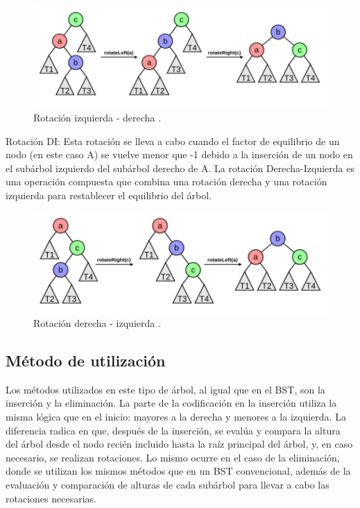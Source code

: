 \documentclass[journal]{IEEEtran}
\begin{document}
\begin{figure}[H]
    \centering
    \includegraphics[scale=0.7]{LR rotation.PNG}
    \captionsetup{justification=centering}  %
    \caption{Rotación izquierda - derecha \cite{Algoritmos y Programación}.}
    \label{fig:enter-label}
\end{figure}

Rotación DI: Esta rotación se lleva a cabo cuando el factor de equilibrio de un nodo (en este caso A) se vuelve menor que -1 debido a la inserción de un nodo en el subárbol izquierdo del subárbol derecho de A. La rotación Derecha-Izquierda es una operación compuesta que combina una rotación derecha y una rotación izquierda para restablecer el equilibrio del árbol. 

\begin{figure}[H]
    \centering
    \includegraphics[scale=0.7]{RL rotation.PNG}
    \captionsetup{justification=centering}  %
    \caption{Rotación derecha - izquierda \cite{Algoritmos y Programación}.}
    \label{fig:enter-label}
\end{figure}

\subsection{Método de utilización}

Los métodos utilizados en este tipo de árbol, al igual que en el BST, son la inserción y la eliminación. La parte de la codificación en la inserción utiliza la misma lógica que en el inicio: mayores a la derecha y menores a la izquierda. La diferencia radica en que, después de la inserción, se evalúa y compara la altura del árbol desde el nodo recién incluido hasta la raíz principal del árbol, y, en caso necesario, se realizan rotaciones. Lo mismo ocurre en el caso de la eliminación, donde se utilizan los mismos métodos que en un BST convencional, además de la evaluación y comparación de alturas de cada subárbol para llevar a cabo las rotaciones necesarias.
\end{document}
